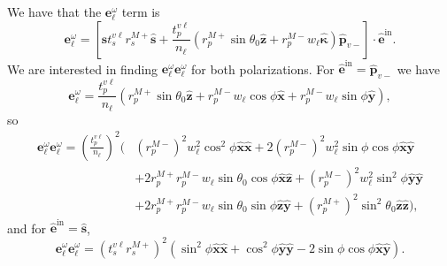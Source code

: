 We have that the $\mathbf{e}^{\omega}_{\ell}$ term is 
\begin{equation*}\label{eq:ewellmr}
\mathbf{e}^{\omega}_{\ell} = 
\left[
\hat{\mathbf{s}}t_{s}^{v\ell}r_{s}^{M+}\hat{\mathbf{s}} 
+ \frac{t^{v\ell}_{p}}{n_{\ell}}
\left(
  r^{M+}_{p}\sin\theta_{0}\hat{\mathbf{z}} 
+ r^{M-}_{p}w_{\ell}\hat{\boldsymbol{\kappa}}
\right)
\hat{\mathbf{p}}_{v-}
\right]
\cdot\hat{\mathbf{e}}^{\mathrm{in}}.
\end{equation*}
We are interested in finding
$\mathbf{e}^{\omega}_{\ell}\mathbf{e}^{\omega}_{\ell}$ for both polarizations.
For $\hat{\mathbf{e}}^{\mathrm{in}} = \hat{\mathbf{p}}_{v-}$ we have
\begin{equation*}
\mathbf{e}^{\omega}_{\ell} = 
\frac{t^{v\ell}_{p}}{n_{\ell}}
\left(
  r^{M+}_{p}\sin\theta_{0}\hat{\mathbf{z}} 
+ r^{M-}_{p}w_{\ell}\cos\phi\hat{\mathbf{x}}
+ r^{M-}_{p}w_{\ell}\sin\phi\hat{\mathbf{y}}
\right),
\end{equation*}
so
\begin{equation}\label{eq:ewewpmr}
\begin{split}
\mathbf{e}^{\omega}_{\ell}\mathbf{e}^{\omega}_{\ell} =
\left(\frac{t^{v\ell}_{p}}{n_{\ell}}\right)^{2}
\bigg(&
   \left(r^{M-}_{p}\right)^{2}w^{2}_{\ell}\cos^{2}\phi
   \hat{\mathbf{x}}\hat{\mathbf{x}}
 + 2\left(r^{M-}_{p}\right)^{2}w^{2}_{\ell}\sin\phi\cos\phi
   \hat{\mathbf{x}}\hat{\mathbf{y}}\\
&+ 2r^{M+}_{p}r^{M-}_{p}w_{\ell}\sin\theta_{0}\cos\phi
   \hat{\mathbf{x}}\hat{\mathbf{z}}
 + \left(r^{M-}_{p}\right)^{2}w^{2}_{\ell}\sin^{2}\phi
   \hat{\mathbf{y}}\hat{\mathbf{y}}\\
&+ 2r^{M+}_{p}r^{M-}_{p}w_{\ell}\sin\theta_{0}\sin\phi
   \hat{\mathbf{z}}\hat{\mathbf{y}}
 + \left(r^{M+}_{p}\right)^{2}\sin^{2}\theta_{0}
   \hat{\mathbf{z}}\hat{\mathbf{z}}
\bigg),
\end{split}
\end{equation}
and for $\hat{\mathbf{e}}^{\mathrm{in}} = \hat{\mathbf{s}}$,
\begin{equation}\label{eq:ewewsmr}
\mathbf{e}^{\omega}_{\ell}\mathbf{e}^{\omega}_{\ell}
= \left(t^{v\ell}_{s}r^{M+}_{s}\right)^{2}
\left(
  \sin^{2}\phi\hat{\mathbf{x}}\hat{\mathbf{x}}
+ \cos^{2}\phi\hat{\mathbf{y}}\hat{\mathbf{y}} 
- 2\sin\phi\cos\phi\hat{\mathbf{x}}\hat{\mathbf{y}}
\right).
\end{equation}

